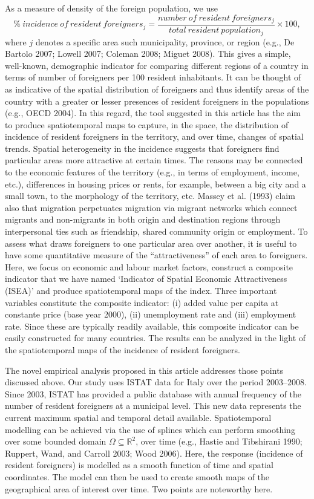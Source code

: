 \documentclass[10pt]{article}
\newcommand{\beq}{\begin{equation}}
\newcommand{\eeq}{\end{equation}}
\theoremstyle{definition}
\theoremstyle{plain}
\begin{document}
As a measure of density of the foreign population, we use
\beq
\% \ incidence \ of \ resident \ foreigners_j  = \frac{number \ of \ resident \ foreigners_j}{total \ resident \ population_j} \times 100,
\label{first.d1}
\eeq
where $j$ denotes a specific area such municipality, province, or region (e.g., De Bartolo 2007; Lowell 2007; Coleman 2008; Miguet 2008). This gives a simple, well-known, demographic indicator for comparing different regions of a country in terms of number of foreigners per 100 resident inhabitants. It can be thought of as indicative of the spatial distribution of foreigners and thus identify areas of the country with a greater or lesser presences of resident foreigners in the populations (e.g., OECD 2004). In this regard, the tool suggested in this article has the aim to produce spatiotemporal maps to capture, in the space, the distribution of incidence of resident foreigners in the territory, and over time, changes of spatial trends. Spatial heterogeneity in the incidence suggests that foreigners find particular areas more attractive at certain times. The reasons may be connected to the economic features of the territory (e.g., in terms of employment, income, etc.), differences in housing prices or rents, for example, between a big city and a small town, to the morphology of the territory, etc. Massey et al. (1993) claim also that migration perpetuates migration via migrant networks which connect migrants and non-migrants in both origin and destination regions through interpersonal ties such as friendship, shared community origin or employment. To assess what draws foreigners to one particular area over another, it is useful to have some quantitative measure of the ``attractiveness'' of each area to foreigners. Here, we focus on economic and labour market factors, construct a composite indicator that we have named `Indicator of Spatial Economic Attractiveness (ISEA)' and produce spatiotemporal maps of the index. Three important variables constitute the composite indicator: (i) added value per capita at constante price (base year 2000), (ii) unemployment rate and (iii) employment rate. Since these are typically readily available, this composite indicator can be easily constructed for many countries. The results can be analyzed in the light of the spatiotemporal maps of the incidence of resident foreigners.

The novel empirical analysis proposed in this article addresses those points discussed above. Our study uses  ISTAT data for Italy over the period 2003--2008. Since 2003, ISTAT has provided a public database with annual frequency of the number of resident foreigners at a municipal level. This new data represents the current maximum spatial and temporal detail available. Spatiotemporal modelling can be achieved via the use of splines which can perform smoothing over some bounded domain $\Omega\subseteq\mathbb{R}^2$, over time (e.g., Hastie and Tibshirani 1990; Ruppert, Wand, and Carroll 2003; Wood 2006). Here, the response (incidence of resident foreigners) is modelled as a smooth function of time and spatial coordinates. The model can then be used to create smooth maps of the geographical area of interest over time. Two points are noteworthy here. 
\end{document}
